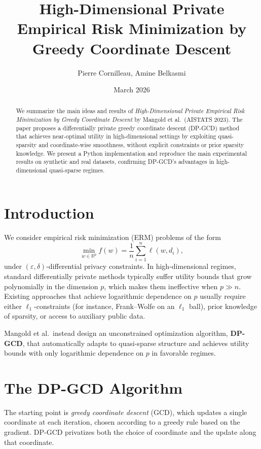 \documentclass[11pt,a4paper]{article}
\title{High-Dimensional Private Empirical Risk Minimization by Greedy Coordinate Descent}
\author{Pierre Cornilleau, Amine Belkasmi}
\date{March 2026}
\begin{document}
\maketitle

\begin{abstract}
We summarize the main ideas and results of \emph{High-Dimensional Private Empirical Risk Minimization by Greedy Coordinate Descent} by Mangold et al.\ (AISTATS 2023). The paper proposes a differentially private greedy coordinate descent (DP-GCD) method that achieves near-optimal utility in high-dimensional settings by exploiting quasi-sparsity and coordinate-wise smoothness, without explicit constraints or prior sparsity knowledge. We present a Python implementation and reproduce the main experimental results on synthetic and real datasets, confirming DP-GCD's advantages in high-dimensional quasi-sparse regimes.
\end{abstract}

\section{Introduction}

We consider empirical risk minimization (ERM) problems of the form
\[
\min_{w \in \mathbb{R}^p} f(w) = \frac{1}{n} \sum_{i=1}^{n} \ell(w, d_i),
\]
under $(\varepsilon, \delta)$-differential privacy constraints. In high-dimensional regimes, standard differentially private methods typically suffer utility bounds that grow polynomially in the dimension $p$, which makes them ineffective when $p \gg n$. Existing approaches that achieve logarithmic dependence on $p$ usually require either $\ell_1$-constraints (for instance, Frank--Wolfe on an $\ell_1$ ball), prior knowledge of sparsity, or access to auxiliary public data.

Mangold et al.\ instead design an unconstrained optimization algorithm, \textbf{DP-GCD}, that automatically adapts to quasi-sparse structure and achieves utility bounds with only logarithmic dependence on $p$ in favorable regimes.

\section{The DP-GCD Algorithm}

The starting point is \emph{greedy coordinate descent} (GCD), which updates a single coordinate at each iteration, chosen according to a greedy rule based on the gradient. DP-GCD privatizes both the choice of coordinate and the update along that coordinate.
\end{document}
